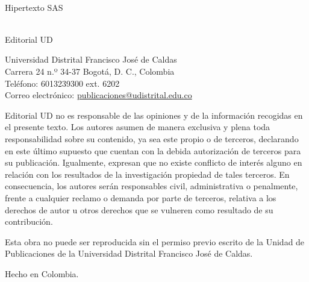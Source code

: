 \begin{minipage}[t]{4.46in}
\begin{minipage}[t]{0.45\textwidth}
\begin{raggedright}
      \\
      \indentar Hipertexto SAS

      \vspace{0.5em}

      \\
      \indentar Editorial UD
    \end{raggedright}
  \end{minipage}\hfill
  \begin{minipage}[t]{0.49\textwidth}
    \begin{raggedright}

      Universidad Distrital Francisco José de Caldas\\
      Carrera 24 n.º 34-37 Bogotá, D. C., Colombia\\
      Teléfono: 6013239300 ext. 6202\\
      Correo electrónico: \href{mailto:publicaciones@udistrital.edu.co}{publicaciones@udistrital.edu.co}

      \vspace{1.2em}

      \begingroup\fontsize{6pt}{7pt}\opseries\selectfont

      Editorial UD no es responsable de las opiniones y de la
      información recogidas en el presente texto. Los autores
      asumen de manera exclusiva y plena toda responsabilidad
      sobre su contenido, ya sea este propio o de terceros,
      declarando en este último supuesto que cuentan con
      la debida autorización de terceros para su publicación.
      Igualmente, expresan que no existe conflicto de interés
      alguno en relación con los resultados de la investigación
      propiedad de tales terceros. En consecuencia, los autores
      serán responsables civil, administrativa o penalmente, frente
      a cualquier reclamo o demanda por parte de terceros,
      relativa a los derechos de autor u otros derechos que se
      vulneren como resultado de su contribución.

      \vspace{1.2em}


      Esta obra no puede ser reproducida sin el permiso previo
      escrito de la Unidad de Publicaciones de la Universidad
      Distrital Francisco José de Caldas.

      Hecho en Colombia.
      \endgroup
    \end{raggedright}
  \end{minipage}


\end{minipage}
